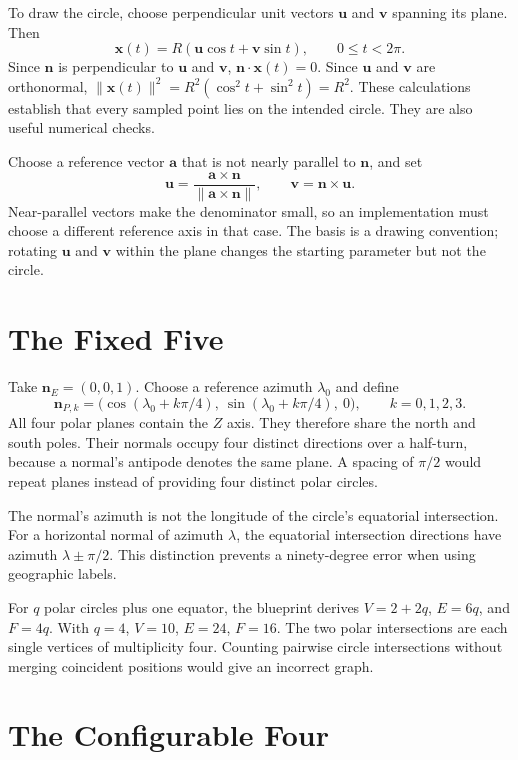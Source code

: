 To draw the circle, choose perpendicular unit vectors $\mathbf u$ and $\mathbf v$ spanning its plane. Then
\[
  \mathbf x(t)=R(\mathbf u\cos t+\mathbf v\sin t),\qquad 0\le t<2\pi.
\]
Since $\mathbf n$ is perpendicular to $\mathbf u$ and $\mathbf v$, $\mathbf n\cdot\mathbf x(t)=0$. Since $\mathbf u$ and $\mathbf v$ are orthonormal, $\|\mathbf x(t)\|^2=R^2(\cos^2t+\sin^2t)=R^2$. These calculations establish that every sampled point lies on the intended circle. They are also useful numerical checks.

Choose a reference vector $\mathbf a$ that is not nearly parallel to $\mathbf n$, and set
\[
  \mathbf u=\frac{\mathbf a\times\mathbf n}{\|\mathbf a\times\mathbf n\|},\qquad
  \mathbf v=\mathbf n\times\mathbf u.
\]
Near-parallel vectors make the denominator small, so an implementation must choose a different reference axis in that case. The basis is a drawing convention; rotating $\mathbf u$ and $\mathbf v$ within the plane changes the starting parameter but not the circle.

\section{The Fixed Five}

Take $\mathbf n_E=(0,0,1)$. Choose a reference azimuth $\lambda_0$ and define
\[
  \mathbf n_{P,k}=\bigl(\cos(\lambda_0+k\pi/4),\ \sin(\lambda_0+k\pi/4),\ 0\bigr),
  \qquad k=0,1,2,3.
\]
All four polar planes contain the $Z$ axis. They therefore share the north and south poles. Their normals occupy four distinct directions over a half-turn, because a normal's antipode denotes the same plane. A spacing of $\pi/2$ would repeat planes instead of providing four distinct polar circles.

The normal's azimuth is not the longitude of the circle's equatorial intersection. For a horizontal normal of azimuth $\lambda$, the equatorial intersection directions have azimuth $\lambda\pm\pi/2$. This distinction prevents a ninety-degree error when using geographic labels.

For $q$ polar circles plus one equator, the blueprint derives $V=2+2q$, $E=6q$, and $F=4q$. With $q=4$, $V=10$, $E=24$, $F=16$. The two polar intersections are each single vertices of multiplicity four. Counting pairwise circle intersections without merging coincident positions would give an incorrect graph.

\section{The Configurable Four}

